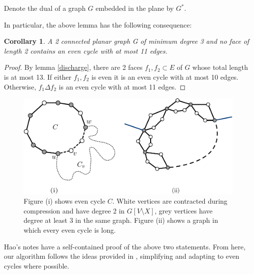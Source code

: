 \documentclass{article}
\newcommand{\0}{\mathbb{0}}
\newcommand{\1}{\mathbb{1}}
\newtheorem{cor}[theorem]{Corollary}
\begin{document}
Denote the dual of a graph $G$ embedded in the plane by $G^*$.   

In particular, the above lemma has the following consequence:

\begin{cor}\label{cor:smallec}
  A 2 connected planar graph G of minimum degree 3 and no face of
  length 2 contains an even cycle with at most 11 edges.
\end{cor}
\begin{proof}
By lemma \ref{discharge}, there are 2 faces $f_1,f_2 \subset E$ of $G$ whose total length is at most 13. If either $f_1,f_2$ is even it is an even cycle with at most 10 edges. Otherwise,  $f_1 \Delta f_2$ is an even cycle with at most 11 edges.
\end{proof}


\begin{figure}
  \begin{center}
    \includegraphics[width=.9\textwidth]{simple-pd.pdf}
  \end{center}
  \caption{\label{fig:simplepd} Figure (i) shows even cycle
    $C$. White vertices are contracted during compression and have
    degree 2 in $G[V\setminus X]$, grey vertices have degree at least
    3 in the same graph. Figure (ii) shows a graph in which every even cycle is long. }
\end{figure}

Hao's notes have a self-contained proof of the above two statements.
From here, our algorithm follows the ideas provided in \cite{FJP10},
simplifying and adapting to even cycles where possible. 
\end{document}
